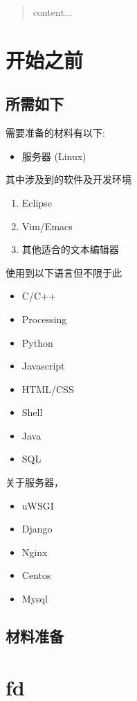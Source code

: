 \documentclass[11pt]{article} %
\title{}
\author{2Gether }
\date{1 28,2013} %
\begin{document}
\begin{CJK*}{UTF8}{gbsn}
\maketitle
\newpage
\renewcommand\abstractname{}
\begin{abstract}
content...
\end{abstract}
\newpage
\renewcommand\contentsname{目录}
\tableofcontents
\newpage


\section{开始之前}

\subsection{所需如下}
\large 需要准备的材料有以下:
\begin{itemize}
\item{服务器 (Linux)}
\end{itemize}
\large 其中涉及到的软件及开发环境
\begin{enumerate}
\item{Eclipse}
\item{Vim/Emacs}
\item{其他适合的文本编辑器} 
\end{enumerate}
\large 使用到以下语言但不限于此
\begin{itemize}
\item{C/C++}
\item{Processing}
\item{Python}
\item{Javascript}
\item{HTML/CSS}
\item{Shell}
\item{Java}
\item{SQL}
\end{itemize}

\large 关于服务器，
\begin{itemize}
\item{uWSGI}
\item{Django}
\item{Nginx}
\item{Centos}
\item{Mysql}
\end{itemize}

\newpage
\subsection{材料准备}
\section{fd}

\end{CJK*}
\end{document}
